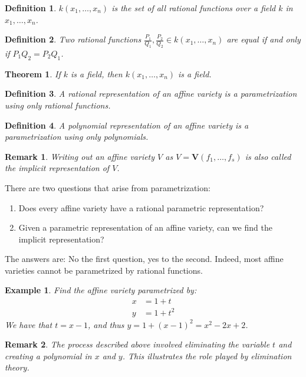 \documentclass[oneside]{book}
\theoremstyle{mystyle}
\newtheorem{theorem}{Theorem}[section]
\newtheorem{definition}{Definition}[section]
\newtheorem{example}{Example}[section]
\newtheorem{remark}{Remark}[section]
\begin{document}
\begin{definition}
$k(x_1,\hdots ,x_n)$ is the set of all rational functions over a field $k$ in $x_1,\hdots, x_n$.
\end{definition}
\begin{definition}
Two rational functions $\frac{P_1}{Q_1}, \frac{P_2}{Q_2} \in k(x_1,\hdots ,x_n)$ are equal if and only if $P_1Q_2 = P_2Q_1$.
\end{definition}
\begin{theorem}
If $k$ is a field, then $k(x_1,\hdots ,x_n)$ is a field.
\end{theorem}
\begin{definition}
A rational representation of an affine variety is a parametrization using only rational functions.
\end{definition}
\begin{definition}
A polynomial representation of an affine variety is a parametrization using only polynomials.
\end{definition}
\begin{remark}
Writing out an affine variety $V$ as $V=\mathbf{V}(f_1,\hdots, f_s)$ is also called the implicit representation of $V$.
\end{remark}
There are two questions that arise from parametrization:
\begin{enumerate}
    \item Does every affine variety have a rational parametric representation?
    \item Given a parametric representation of an affine variety, can we find the implicit representation?
\end{enumerate}
The answers are: No the first question, yes to the second. Indeed, most affine varieties cannot be parametrized by rational functions.
\begin{example}
Find the affine variety parametrized by:
\begin{align*}
    x &= 1+t \\
    y &= 1+t^2
\end{align*}
We have that $t = x-1$, and thus $y = 1+(x-1)^2 = x^2-2x+2$.
\end{example}
\begin{remark}
The process described above involved eliminating the variable $t$ and creating a polynomial in $x$ and $y$. This illustrates the role played by elimination theory.
\end{remark}
\end{document}
